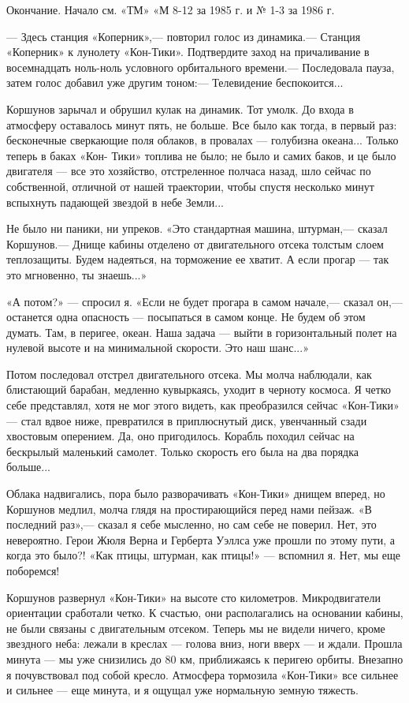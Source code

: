\documentclass[11pt,a4paper,oneside]{article}
\begin{document}
Окончание. Начало см. «ТМ» «М 8-12 за 1985 г. и № 1-3 за 1986 г.

— Здесь станция «Коперник»,— повторил голос из динамика.— Станция «Коперник» к лунолету «Кон-Тики». Подтвердите заход на причаливание в восемнадцать ноль-ноль условного орбитального времени.— Последовала пауза, затем голос добавил уже другим тоном:— Телевидение беспокоится...

Коршунов зарычал и обрушил кулак на динамик. Тот умолк. До входа в атмосферу оставалось минут пять, не больше. Все было как тогда, в первый раз: бесконечные сверкающие поля облаков, в провалах — голубизна океана... Только теперь в баках «Кон- Тики» топлива не было; не было и самих баков, и це было двигателя — все это хозяйство, отстреленное полчаса назад, шло сейчас по собственной, отличной от нашей траектории, чтобы спустя несколько минут вспыхнуть падающей звездой в небе Земли...

Не было ни паники, ни упреков. «Это стандартная машина, штурман,— сказал Коршунов.— Днище кабины отделено от двигательного отсека толстым слоем теплозащиты. Будем надеяться, на торможение ее хватит. А если прогар — так это мгновенно, ты знаешь...»

«А потом?» — спросил я. «Если не будет прогара в самом начале,— сказал он,— останется одна опасность — посыпаться в самом конце. Не будем об этом думать. Там, в перигее, океан. Наша задача — выйти в горизонтальный полет на нулевой высоте и на минимальной скорости. Это наш шанс...»

Потом последовал отстрел двигательного отсека. Мы молча наблюдали, как блистающий барабан, медленно кувыркаясь, уходит в черноту космоса. Я четко себе представлял, хотя не мог этого видеть, как преобразился сейчас «Кон-Тики» — стал вдвое ниже, превратился в приплюснутый диск, увенчанный сзади хвостовым оперением. Да, оно пригодилось. Корабль походил сейчас на бескрылый маленький самолет. Только скорость его была на два порядка больше...

Облака надвигались, пора было разворачивать «Кон-Тики» днищем вперед, но Коршунов медлил, молча глядя на простирающийся перед нами пейзаж. «В последний раз»,— сказал я себе мысленно, но сам себе не поверил. Нет, это невероятно. Герои Жюля Верна и Герберта Уэллса уже прошли по этому пути, а когда это было?! «Как птицы, штурман, как птицы!» — вспомнил я. Нет, мы еще поборемся!

Коршунов развернул «Кон-Тики» на высоте сто километров. Микродвигатели ориентации сработали четко. К счастью, они располагались на основании кабины, не были связаны с двигательным отсеком. Теперь мы не видели ничего, кроме звездного неба: лежали в креслах — голова вниз, ноги вверх — и ждали. Прошла минута — мы уже снизились до 80 км, приближаясь к перигею орбиты. Внезапно я почувствовал под собой кресло. Атмосфера тормозила «Кон-Тики» все сильнее и сильнее — еще минута, и я ощущал уже нормальную земную тяжесть.
\end{document}
